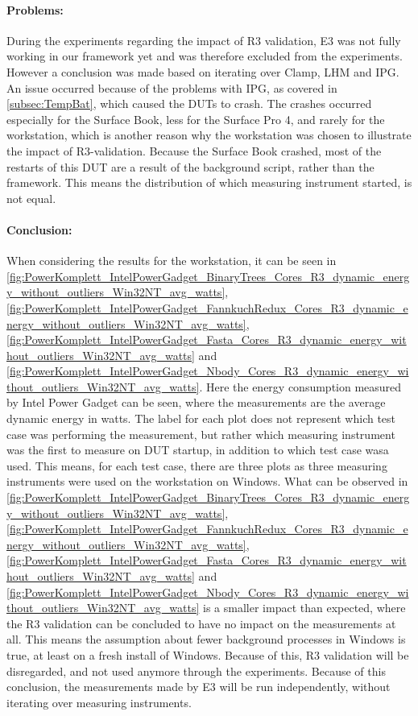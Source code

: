 \paragraph{Problems:} During the experiments regarding the impact of R3 validation, E3 was not fully working in our framework yet and was therefore excluded from the experiments. However a conclusion was made based on iterating over Clamp, LHM and IPG. An issue occurred because of the problems with IPG, as covered in \cref{subsec:TempBat}, which caused the DUTs to crash. The crashes occurred especially for the Surface Book, less for the Surface Pro 4, and rarely for the workstation, which is another reason why the workstation was chosen to illustrate the impact of R3-validation. Because the Surface Book crashed, most of the restarts of this DUT are a result of the background script, rather than the framework. This means the distribution of which measuring instrument started, is not equal.

\paragraph{Conclusion:} When considering the results for the workstation, it can be seen in \cref{fig:PowerKomplett_IntelPowerGadget_BinaryTrees_Cores_R3_dynamic_energy_without_outliers_Win32NT_avg_watts}, \cref{fig:PowerKomplett_IntelPowerGadget_FannkuchRedux_Cores_R3_dynamic_energy_without_outliers_Win32NT_avg_watts}, \cref{fig:PowerKomplett_IntelPowerGadget_Fasta_Cores_R3_dynamic_energy_without_outliers_Win32NT_avg_watts} and \cref{fig:PowerKomplett_IntelPowerGadget_Nbody_Cores_R3_dynamic_energy_without_outliers_Win32NT_avg_watts}. Here the energy consumption measured by Intel Power Gadget can be seen, where the measurements are the average dynamic energy in watts. The label for each plot does not represent which test case was performing the measurement, but rather which measuring instrument was the first to measure on DUT startup, in addition to which test case wasa used. This means, for each test case, there are three plots as three measuring instruments were used on the workstation on Windows. What can be observed in \cref{fig:PowerKomplett_IntelPowerGadget_BinaryTrees_Cores_R3_dynamic_energy_without_outliers_Win32NT_avg_watts}, \cref{fig:PowerKomplett_IntelPowerGadget_FannkuchRedux_Cores_R3_dynamic_energy_without_outliers_Win32NT_avg_watts}, \cref{fig:PowerKomplett_IntelPowerGadget_Fasta_Cores_R3_dynamic_energy_without_outliers_Win32NT_avg_watts} and \cref{fig:PowerKomplett_IntelPowerGadget_Nbody_Cores_R3_dynamic_energy_without_outliers_Win32NT_avg_watts} is a smaller impact than expected, where the R3 validation can be concluded to have no impact on the measurements at all. This means the assumption about fewer background processes in Windows is true, at least on a fresh install of Windows. Because of this, R3 validation will be disregarded, and not used anymore through the experiments. Because of this conclusion, the measurements made by E3 will be run independently, without iterating over measuring instruments.
